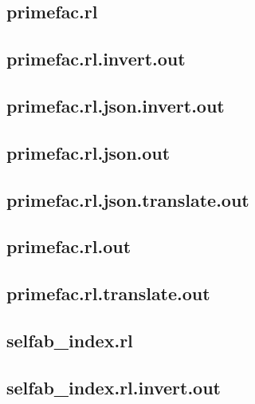 \subsection{primefac.rl}
\label{app:primefac_rl}

\subsection{primefac.rl.invert.out}
\label{app:primefac_rl.invert.out}

\subsection{primefac.rl.json.invert.out}
\label{app:primefac_rl.json.invert.out}

\subsection{primefac.rl.json.out}
\label{app:primefac_rl.json.out}

\subsection{primefac.rl.json.translate.out}
\label{app:primefac_rl.json.translate.out}

\subsection{primefac.rl.out}
\label{app:primefac_rl.out}

\subsection{primefac.rl.translate.out}
\label{app:primefac_rl.translate.out}

\subsection{selfab\_index.rl}
\label{app:selfab_index_rl}

\subsection{selfab\_index.rl.invert.out}
\label{app:selfab_index_rl.invert.out}

